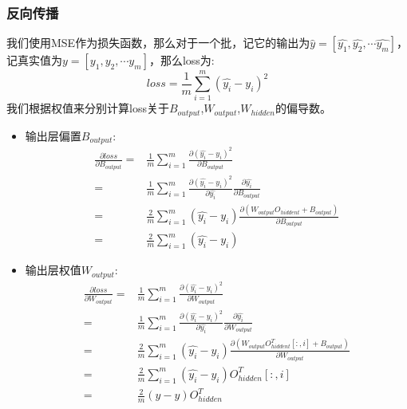 \documentclass[UTF8]{ctexart}
\begin{document}
\subsubsection{反向传播}
我们使用MSE作为损失函数，那么对于一个批，记它的输出为$\hat{y} = [\hat{y_1},\hat{y_2},\cdots\hat{y_m}]$，记真实值为$y=[y_1,y_2,\cdots y_m]$，那么loss为:
\begin{equation*}
    loss = \frac{1}{m} \sum_{i=1}^m (\hat{y_i}-y_i)^2
\end{equation*}
我们根据权值来分别计算loss关于$B_{output}$,$W_{output}$,$W_{hidden}$的偏导数。
\begin{itemize}
    \item 输出层偏置$B_{output}$:
    \begin{equation*}
        \begin{aligned}
            \frac{\partial loss}{\partial B_{output}} =& \frac{1}{m} \sum_{i=1}^{m} \frac{\partial (\hat{y_i}-y_i)^2}{\partial B_{output}}  \\
            =& \frac{1}{m} \sum_{i=1}^m \frac{\partial (\hat{y_i}-y_i)^2}{\partial \hat{y_i}} \frac{\partial \hat{y_i}}{\partial B_{output}} \\
            =& \frac{2}{m} \sum_{i=1}^m  (\hat{y_i}-y_i) \frac{\partial (W_{output} O_{hiddent} + B_{output})}{\partial B_{output}} \\
            =& \frac{2}{m} \sum_{i=1}^m  (\hat{y_i}-y_i)
        \end{aligned}
    \end{equation*}

    \item 输出层权值$W_{output}$:
    \begin{equation*}
        \begin{aligned}
            \frac{\partial loss}{\partial W_{output}} =& \frac{1}{m} \sum_{i=1}^{m} \frac{\partial (\hat{y_i}-y_i)^2}{\partial W_{output}}  \\
            =& \frac{1}{m} \sum_{i=1}^m \frac{\partial (\hat{y_i}-y_i)^2}{\partial \hat{y_i}} \frac{\partial \hat{y_i}}{\partial W_{output}} \\
            =& \frac{2}{m} \sum_{i=1}^m  (\hat{y_i}-y_i) \frac{\partial (W_{output} O_{hiddent}^T[:,i] + B_{output})}{\partial W_{output}} \\
            =& \frac{2}{m} \sum_{i=1}^m  (\hat{y_i}-y_i) O_{hidden}^T[:,i] \\
            =& \frac{2}{m} (\hat{y}-y) O_{hidden}^T
        \end{aligned}
    \end{equation*}


\end{itemize}
\end{document}
